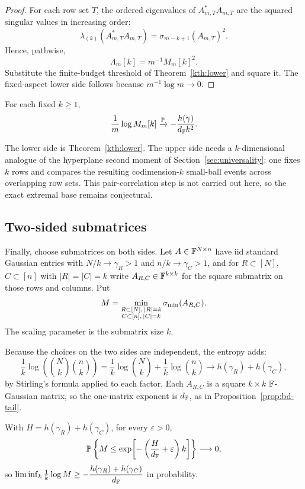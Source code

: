 \begin{proof}
For each row set \(T\), the ordered eigenvalues of
\(A_{m,T}^*A_{m,T}\) are the squared singular values in increasing order:
\[
  \lambda_{(k)}(A_{m,T}^*A_{m,T})
  =
  \sigma_{m-k+1}(A_{m,T})^2 .
\]
Hence, pathwise,
\[
  \Lambda_m[k]=m^{-1}M_m[k]^2.
\]
Substitute the finite-budget threshold of Theorem~\ref{kth:lower} and square
it.  The fixed-aspect lower side follows because \(m^{-1}\log m\to0\).
\end{proof}

\begin{conjecture}\label{kth:extremal}
For each fixed \(k\ge1\),
\[
  \frac1m\log M_m[k]\xrightarrow{\mathbb{P}}-\frac{h(\gamma)}{d_{\mathbb{F}} k^2}.
\]
\end{conjecture}

The lower side is Theorem~\ref{kth:lower}.  The upper side needs a
\(k\)-dimensional analogue of the hyperplane second moment of
Section~\ref{sec:universality}: one fixes \(k\) rows and compares the resulting
codimension-\(k\) small-ball events across overlapping row sets.  This
pair-correlation step is not carried out here, so the exact extremal base remains
conjectural.

\subsection{Two-sided submatrices}

Finally, choose submatrices on both sides.  Let \(A\in\mathbb{F}^{N\times n}\) have iid
standard Gaussian entries with \(N/k\to\gamma_R>1\) and \(n/k\to\gamma_C>1\), and
for \(R\subset[N]\), \(C\subset[n]\) with \(|R|=|C|=k\) write
\(A_{R,C}\in\mathbb{F}^{k\times k}\) for the square submatrix on those rows and columns.
Put
\[
  M=\min_{\substack{R\subset[N],\,|R|=k\\ C\subset[n],\,|C|=k}}\sigma_{\min}(A_{R,C}).
\]
The scaling parameter is the submatrix size \(k\).

Because the choices on the two sides are independent, the entropy adds:
\[
  \frac1k\log\!\left(\binom Nk\binom nk\right)
  =\frac1k\log\binom Nk+\frac1k\log\binom nk
  \longrightarrow h(\gamma_R)+h(\gamma_C),
\]
by Stirling's formula applied to each factor.  Each \(A_{R,C}\) is a square
\(k\times k\) \(\mathbb{F}\)-Gaussian matrix, so the one-matrix exponent is \(d_{\mathbb{F}}\), as
in Proposition~\ref{prop:bd-tail}.

\begin{theorem}\label{two:lower}
With \(H=h(\gamma_R)+h(\gamma_C)\), for every \(\varepsilon>0\),
\[
  \mathbb{P}\left\{M\le\exp\!\left[-\left(\frac{H}{d_{\mathbb{F}}}+\varepsilon\right)k\right]\right\}
  \longrightarrow0,
\]
so \(\liminf_k\frac1k\log M\ge-\dfrac{h(\gamma_R)+h(\gamma_C)}{d_{\mathbb{F}}}\) in
probability.
\end{theorem}

